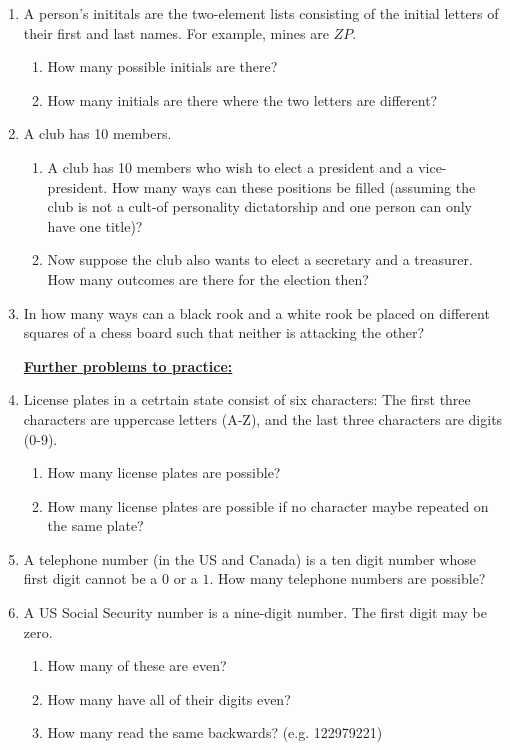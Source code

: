 \documentclass[11pt]{preprint}
\begin{document}
\begin{enumerate}
\item A person's inititals are the two-element lists consisting of the initial letters of their first and last names. For example, mines are $ZP$. 
\begin{enumerate}
\item How many possible initials are there?
\item How many initials are there where the two letters are different?
\end{enumerate}
\item A club has 10 members.
\begin{enumerate}
\item A club has 10 members who wish to elect a president and a vice-president. How many ways can these positions be filled (assuming the club is not a cult-of personality dictatorship and one person can only have one title)?
\item Now suppose the club also wants to elect a secretary and a treasurer. How many outcomes are there for the election then?
\end{enumerate}

\item In how many ways can a black rook and a white rook be placed on different squares of a chess board such that neither is attacking the other?

\vspace{0.2cm}

\noindent\underline{\textbf{Further problems to practice:}}
\vspace{0.1cm}

\item License plates in a cetrtain state consist of six characters: The first three characters are uppercase letters (A-Z), and the last three characters are digits (0-9).
\begin{enumerate}
\item How many license plates are possible?
\item How many license plates are possible if no character maybe repeated on the same plate?
\end{enumerate}

\item A telephone number (in the US and Canada) is a ten digit number whose first digit cannot be a $0$ or a $1$. How many telephone numbers are possible?

\item A US Social Security number is a nine-digit number. The first digit may be zero.
\begin{enumerate}
\item How many of these are even?
\item How many have all of their digits even?
\item How many read the same backwards? (e.g. 122979221)
\end{enumerate}

\end{enumerate}
\end{document}
